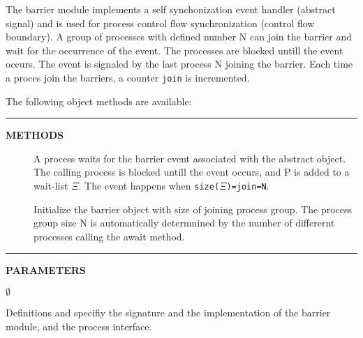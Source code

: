 \documentclass[a4paper,12pt,twoside,english]{article}
\begin{document}
\def\thesubsubsection{\tocXLVI}
\secIII{\label{toclabelXLVI}\thesubsubsection}
The barrier module implements a self synchonization event handler (abstract signal) and is used for
process control flow synchronization (control flow boundary). A group of processes with defined number N can join the barrier and wait for the occurrence of the
event. The processes are blocked untill the event occurs. The event is signaled by the last process N joining the barrier. Each time a proces join the barriers,
a counter {\tt join} is incremented.  


\vskip5pt
The following object methods are available:


\vskip5pt
\vskip5pt\color{highlight-color}
{\rule[-1pt]{2em}{1em}\hskip15pt\bf METHODS

}
\color{black}

\begin{description}
\item[] $ $\\
A process waits for the barrier event associated with the abstract object.  The calling process is blocked untill the event occurs, and P is added to a
wait-list $\Xi$. The event happens when {\tt size(}{\tt $\Xi$}{\tt )=join=N}.

\item[] $ $\\
Initialize the barrier object with size of joining process group. The process group size N is automatically determnined by  the number of differernt processes
calling the await method.


\end{description}
\vskip5pt\color{highlight-color}
{\rule[-1pt]{2em}{1em}\hskip15pt\bf PARAMETERS

}
\color{black}
$\emptyset$

Definitions  and  specifiy the signature and the implementation of the barrier module, and   the process
interface. 
\end{document}
